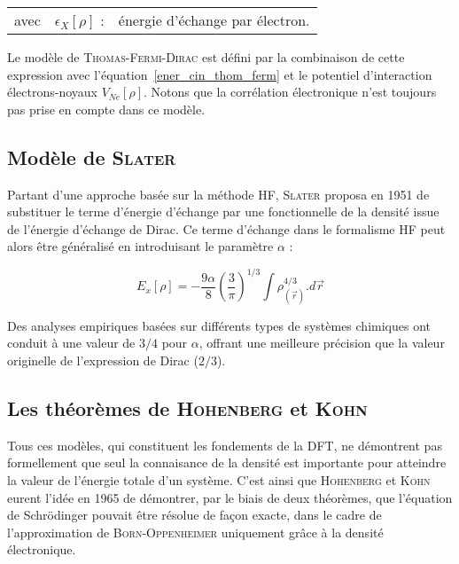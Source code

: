 	\begin{flushleft}
		\begin{tabular}{@{}lrp{10cm}}
			avec & $\epsilon_{X}[\rho]$ : & énergie d'échange par électron. 
		\end{tabular}
	\end{flushleft}
	
	Le modèle de \textsc{Thomas-Fermi-Dirac} est défini par la combinaison de cette expression avec l'équation~\ref{ener_cin_thom_ferm} et le potentiel d'interaction électrons-noyaux $V_{Ne}[\rho]$. Notons que la corrélation électronique n'est toujours pas prise en compte dans ce modèle.
	
	
	\subsection{Modèle de \textsc{Slater}}
	
	Partant d'une approche basée sur la méthode HF, \textsc{Slater} proposa en 1951 de substituer le terme d'énergie d'échange par une fonctionnelle de la densité issue de l'énergie d'échange de Dirac. Ce terme d'échange dans le formalisme HF peut alors être généralisé en introduisant le paramètre $\alpha$ :
	
	\begin{equation}
	E_{x}[\rho] = - \frac{9\alpha}{8} \left(\frac{3}{\pi}\right)^{1/3} \int \rho_{(\vec{r})}^{4/3} .d\vec{r}
	\end{equation}
	
	Des analyses empiriques basées sur différents types de systèmes chimiques ont conduit à une valeur de $3/4$ pour $\alpha$, offrant une meilleure précision que la valeur originelle de l'expression de Dirac ($2/3$).
	
	\subsection{Les théorèmes de \textsc{Hohenberg} et \textsc{Kohn}}
	
	Tous ces modèles, qui constituent les fondements de la DFT, ne démontrent pas formellement que seul la connaisance de la densité est importante pour atteindre la valeur de l'énergie totale d'un système. C'est ainsi que \textsc{Hohenberg} et \textsc{Kohn} eurent l'idée en 1965 de démontrer, par le biais de deux théorèmes, que l'équation de Schr\"{o}dinger pouvait être résolue de façon exacte, dans le cadre de l'approximation de \textsc{Born-Oppenheimer} uniquement grâce à la densité électronique.
	

